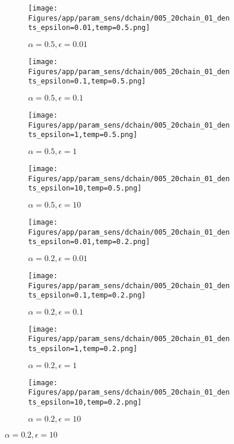 \documentclass{article}
\theoremstyle{plain}
\begin{document}
\begin{appendices}
\begin{figure}
                \begin{subfigure}[b]{0.24\textwidth}
                    \centering
                    \texttt{[image: Figures/app/param\_sens/dchain/005\_20chain\_01\_dents\_epsilon=0.01,temp=0.5.png]}
                    \caption*{$\alpha=0.5,\epsilon=0.01$}
                \end{subfigure}
                \begin{subfigure}[b]{0.24\textwidth}
                    \centering
                    \texttt{[image: Figures/app/param\_sens/dchain/005\_20chain\_01\_dents\_epsilon=0.1,temp=0.5.png]}
                    \caption*{$\alpha=0.5,\epsilon=0.1$}
                \end{subfigure}
                \begin{subfigure}[b]{0.24\textwidth}
                    \centering
                    \texttt{[image: Figures/app/param\_sens/dchain/005\_20chain\_01\_dents\_epsilon=1,temp=0.5.png]}
                    \caption*{$\alpha=0.5,\epsilon=1$}
                \end{subfigure}
                \begin{subfigure}[b]{0.24\textwidth}
                    \centering
                    \texttt{[image: Figures/app/param\_sens/dchain/005\_20chain\_01\_dents\_epsilon=10,temp=0.5.png]}
                    \caption*{$\alpha=0.5,\epsilon=10$}
                \end{subfigure}
                
                \begin{subfigure}[b]{0.24\textwidth}
                    \centering
                    \texttt{[image: Figures/app/param\_sens/dchain/005\_20chain\_01\_dents\_epsilon=0.01,temp=0.2.png]}
                    \caption*{$\alpha=0.2,\epsilon=0.01$}
                \end{subfigure}
                \begin{subfigure}[b]{0.24\textwidth}
                    \centering
                    \texttt{[image: Figures/app/param\_sens/dchain/005\_20chain\_01\_dents\_epsilon=0.1,temp=0.2.png]}
                    \caption*{$\alpha=0.2,\epsilon=0.1$}
                \end{subfigure}
                \begin{subfigure}[b]{0.24\textwidth}
                    \centering
                    \texttt{[image: Figures/app/param\_sens/dchain/005\_20chain\_01\_dents\_epsilon=1,temp=0.2.png]}
                    \caption*{$\alpha=0.2,\epsilon=1$}
                \end{subfigure}
                \begin{subfigure}[b]{0.24\textwidth}
                    \centering
                    \texttt{[image: Figures/app/param\_sens/dchain/005\_20chain\_01\_dents\_epsilon=10,temp=0.2.png]}
                    \caption*{$\alpha=0.2,\epsilon=10$}
                \end{subfigure}
                

\end{figure}
\end{appendices}
\end{document}

